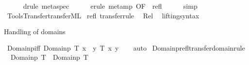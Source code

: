 \begin{isabellebody}
\ \ \ \ \isamarkupfalse%
\ {\isacharparenleft}{\kern0pt}drule\ meta{\isacharunderscore}{\kern0pt}spec{\isacharparenright}{\kern0pt}\isanewline
\ \ \ \ \isamarkupfalse%
\ {\isacharparenleft}{\kern0pt}erule\ meta{\isacharunderscore}{\kern0pt}mp\ {\isacharbrackleft}{\kern0pt}OF\ {\isacharunderscore}{\kern0pt}\ refl{\isacharbrackright}{\kern0pt}{\isacharparenright}{\kern0pt}\isanewline
\ \ \ \ \isamarkupfalse%
\isanewline
{}\isamarkupfalse%
\ simp%
\endisatagproof
{\isafoldproof}%
%
\isadelimproof
\isanewline
%
\endisadelimproof
%
\isadelimML
\isanewline
%
\endisadelimML
%
\isatagML
{}\isamarkupfalse%
\ {\isacartoucheopen}Tools{\isacharslash}{\kern0pt}Transfer{\isacharslash}{\kern0pt}transfer{\isachardot}{\kern0pt}ML{\isacartoucheclose}%
\endisatagML
{\isafoldML}%
%
\isadelimML
\isanewline
%
\endisadelimML
{}\isamarkupfalse%
\ refl\ {\isacharbrackleft}{\kern0pt}transfer{\isacharunderscore}{\kern0pt}rule{\isacharbrackright}{\kern0pt}\isanewline
\isanewline
{}\isamarkupfalse%
\ {\isacharparenleft}{\kern0pt}\ Rel\isanewline
\isanewline
{}\isamarkupfalse%
\ \ lifting{\isacharunderscore}{\kern0pt}syntax\isanewline
{}%
\begin{isamarkuptext}%
Handling of domains%
\end{isamarkuptext}\isamarkuptrue%
\isamarkupfalse%
\ Domainp{\isacharunderscore}{\kern0pt}iff{\isacharcolon}{\kern0pt}\ {\isachardoublequoteopen}Domainp\ T\ x\ {\isasymlongleftrightarrow}\ {\isacharparenleft}{\kern0pt}{\isasymexists}y{\isachardot}{\kern0pt}\ T\ x\ y{\isacharparenright}{\kern0pt}{\isachardoublequoteclose}\isanewline
%
\isadelimproof
\ \ %
\endisadelimproof
%
\isatagproof
{}\isamarkupfalse%
\ auto%
\endisatagproof
{\isafoldproof}%
%
\isadelimproof
\isanewline
%
\endisadelimproof
\isanewline
{}\isamarkupfalse%
\ Domainp{\isacharunderscore}{\kern0pt}refl{\isacharbrackleft}{\kern0pt}transfer{\isacharunderscore}{\kern0pt}domain{\isacharunderscore}{\kern0pt}rule{\isacharbrackright}{\kern0pt}{\isacharcolon}{\kern0pt}\isanewline
\ \ {\isachardoublequoteopen}Domainp\ T\ {\isacharequal}{\kern0pt}\ Domainp\ T{\isachardoublequoteclose}%
\isadelimproof
\ %
\endisadelimproof
%
\isatagproof
\isacommand{{\isachardot}{\kern0pt}{\isachardot}{\kern0pt}}\isamarkupfalse%
%
\endisatagproof
{\isafoldproof}%
%

\end{isabellebody}
